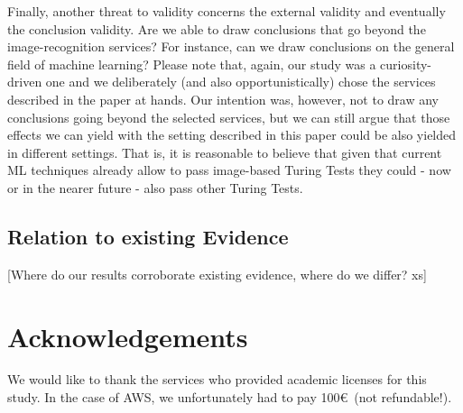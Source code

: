 \documentclass[sigconf,review,anonymous]{acmart}
\begin{document}
Finally, another threat to validity concerns the external validity and eventually the conclusion validity. Are we able to draw conclusions that go beyond the image-recognition services? For instance, can we draw conclusions on the general field of machine learning? Please note that, again, our study was a curiosity-driven one and we deliberately (and also opportunistically) chose the services described in the paper at hands. Our intention was, however, not to draw any conclusions going beyond the selected services, but we can still argue that those effects we can yield with the setting described in this paper could be also yielded in different settings. That is, it is reasonable to believe that given that current ML techniques already allow to pass image-based Turing Tests they could - now or in the nearer future - also pass other Turing Tests. 

\subsection{Relation to existing Evidence}

[Where do our results corroborate existing evidence, where do we differ?  xs]

\section*{Acknowledgements}
We would like to thank the services who provided academic licenses for this study.
In the case of AWS, we unfortunately had to pay 100\euro~(not refundable!).



\end{document}

